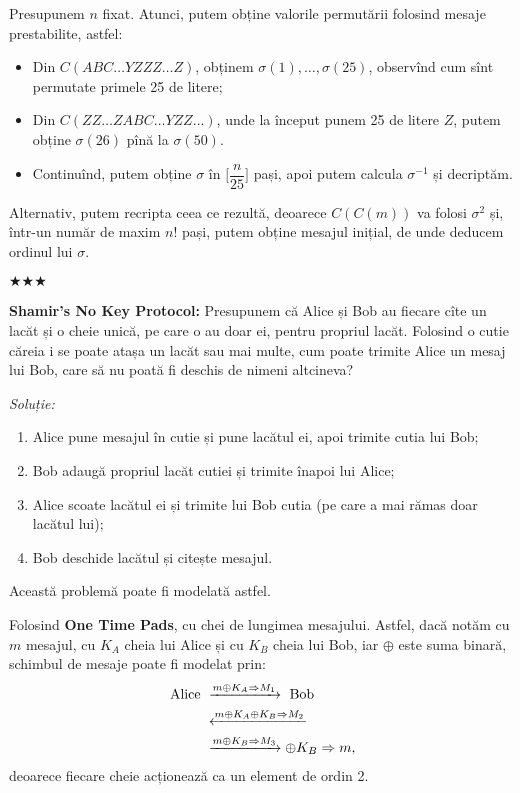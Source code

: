 Presupunem $ n $ fixat. Atunci, putem obține valorile permutării folosind mesaje
prestabilite, astfel:
\begin{itemize}
\item Din $ C(ABC\dots YZZZ \dots Z) $, obținem $ \sigma(1), \dots, \sigma(25) $,
  observînd cum sînt permutate primele 25 de litere;
\item Din $ C(ZZ \dots ZABC \dots YZZ \dots) $, unde la început punem 25 de litere $ Z $,
  putem obține $ \sigma(26) $ pînă la $ \sigma(50) $.
\item Continuînd, putem obține $ \sigma $ în $ \Big[ \dfrac{n}{25} \Big] $ pași, apoi
  putem calcula $ \sigma^{-1} $ și decriptăm.
\end{itemize}

Alternativ, putem recripta ceea ce rezultă, deoarece $ C(C(m)) $ va folosi $ \sigma^2 $
și, într-un număr de maxim $ n! $ pași, putem obține mesajul inițial, de unde
deducem ordinul lui $ \sigma $.

\begin{center}
  {\large $\bigstar\bigstar\bigstar$}
\end{center}

\textbf{Shamir's No Key Protocol:} Presupunem că Alice și Bob au fiecare
cîte un lacăt și o cheie unică, pe care o au doar ei, pentru propriul lacăt.
Folosind o cutie căreia i se poate atașa un lacăt sau mai multe, cum poate trimite
Alice un mesaj lui Bob, care să nu poată fi deschis de nimeni altcineva?

\emph{Soluție:}
\begin{enumerate}[(1)]
\item Alice pune mesajul în cutie și pune lacătul ei, apoi trimite cutia lui Bob;
\item Bob adaugă propriul lacăt cutiei și trimite înapoi lui Alice;
\item Alice scoate lacătul ei și trimite lui Bob cutia (pe care a mai rămas doar lacătul lui);
\item Bob deschide lacătul și citește mesajul.
\end{enumerate}

Această problemă poate fi modelată astfel.

Folosind \textbf{One Time Pads}, cu chei de lungimea mesajului.
 Astfel, dacă notăm cu $ m $ mesajul, cu $ K_A $
cheia lui Alice și cu $ K_B $ cheia lui Bob, iar $ \oplus $ este suma
binară, schimbul de mesaje poate fi modelat prin:
\begin{align*}
  \text{ Alice } &\xrightarrow{m \oplus K_A \Rightarrow M_1} \text{ Bob } \\
                 &\xleftarrow{m \oplus K_A \oplus K_B \Rightarrow M_2 } \\
                 &\xrightarrow{m \oplus K_B \Rightarrow M_3} \oplus K_B \Rightarrow m,
\end{align*}
deoarece fiecare cheie acționează ca un element de ordin 2.

